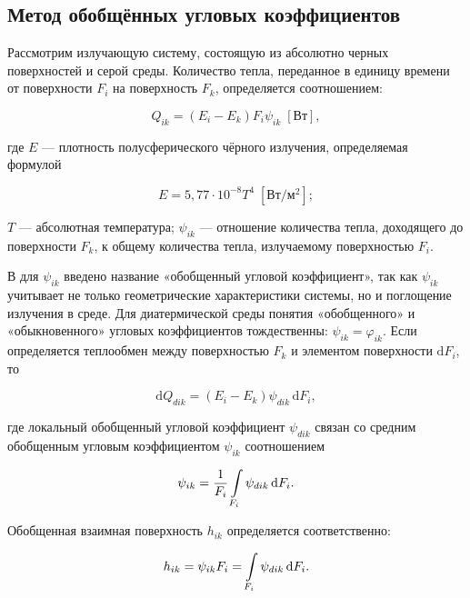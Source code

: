\subsection{Метод обобщённых угловых коэффициентов}

Рассмотрим излучающую систему, состоящую из абсолютно черных поверхностей и серой среды.
Количество тепла, переданное в единицу времени от поверхности $F_i$ на поверхность $F_k$, определяется соотношением:

\begin{equation}
	Q_{ik} = (E_i - E_k) F_i \psi_{ik} \; [\text{Вт}],
\end{equation}

\noindent где $E$ — плотность полусферического чёрного излучения, определяемая формулой

\begin{equation}
	E = 5,77 \cdot 10^{-8} T^4 \; [\text{Вт}/\text{м}^2];
\end{equation}

\noindent $T$ — абсолютная температура; $\psi_{ik}$ — отношение количества тепла, доходящего до поверхности $F_k$, к общему количества тепла, излучаемому поверхностью $F_i$.

В \cite{nevskiy} для $\psi_{ik}$ введено название «обобщенный угловой коэффициент», так как $\psi_{ik}$ учитывает не только геометрические характеристики системы,
но и поглощение излучения в среде.
Для диатермической среды понятия «обобщенного» и «обыкновенного» угловых коэффициентов тождественны: $\psi_{ik} = \varphi_{ik}$.
Если определяется теплообмен между поверхностью $F_k$ и элементом поверхности $\mathrm dF_i$, то

\begin{equation}
	\mathrm dQ_{dik} = (E_i - E_k) \psi_{dik} \,\mathrm dF_i,
\end{equation}

\noindent где локальный обобщенный угловой коэффициент $\psi_{dik}$ связан со средним обобщенным угловым коэффициентом $\psi_{ik}$ соотношением

\begin{equation}
	\psi_{ik} = \frac{1}{F_i} \int\displaylimits_{F_i} \psi_{dik} \,\mathrm dF_i.
\end{equation}

\noindent Обобщенная взаимная поверхность $h_{ik}$ определяется соответственно:

\begin{equation}
	h_{ik} = \psi_{ik}F_i = \int\displaylimits_{F_i} \psi_{dik} \,\mathrm dF_i.
\end{equation}

